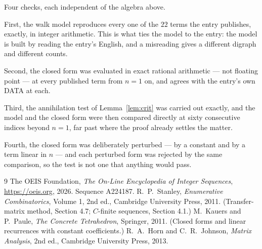 \documentclass[11pt,a4paper]{article}
\theoremstyle{plain}
\theoremstyle{definition}
\begin{document}
Four checks, each independent of the algebra above.

First, the walk model reproduces every one of the $22$ terms the entry publishes,
exactly, in integer arithmetic. This is what ties the model to the entry: the model is built
by reading the entry's English, and a misreading gives a different digraph and different
counts.

Second, the closed form was evaluated in exact rational arithmetic --- not floating point ---
at every published term from $n=1$ on, and agrees with the entry's own DATA at each.

Third, the annihilation test of Lemma~\ref{lem:crit} was carried out exactly, and the model
and the closed form were then compared directly at sixty consecutive indices beyond
$n=1$, far past where the proof already settles the matter.

Fourth, the closed form was deliberately perturbed --- by a constant and by a term linear in
$n$ --- and each perturbed form was rejected by the same comparison, so the test is not one
that anything would pass.

\begin{thebibliography}{9}
 The OEIS Foundation, \emph{The On-Line Encyclopedia of Integer
Sequences}, \url{https://oeis.org}, 2026. Sequence A224187.
 R.~P.~Stanley, \emph{Enumerative Combinatorics}, Volume 1, 2nd ed.,
Cambridge University Press, 2011. (Transfer-matrix method, Section 4.7; $C$-finite sequences,
Section 4.1.)
 M.~Kauers and P.~Paule, \emph{The Concrete Tetrahedron}, Springer, 2011.
(Closed forms and linear recurrences with constant coefficients.)
 R.~A.~Horn and C.~R.~Johnson, \emph{Matrix Analysis}, 2nd ed., Cambridge
University Press, 2013.
\end{thebibliography}
\end{document}
